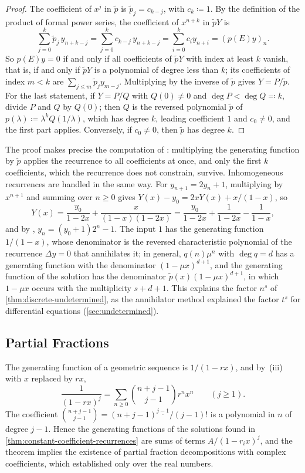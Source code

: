\begin{proof}
The coefficient of $x^j$ in $\tilde p$ is $\tilde p_j=c_{k-j}$, with $c_k\coloneqq1$. By the definition of the product of formal power series, the coefficient of $x^{n+k}$ in $\tilde pY$ is
\[
\sum_{j=0}^k\tilde p_j\,y_{n+k-j}=\sum_{j=0}^kc_{k-j}\,y_{n+k-j}=\sum_{i=0}^kc_iy_{n+i}=(p(E)y)_n .
\]
So $p(E)y=0$ if and only if all coefficients of $\tilde pY$ with index at least $k$ vanish, that is, if and only if $\tilde pY$ is a polynomial of degree less than $k$; its coefficients of index $m<k$ are $\sum_{j\le m}\tilde p_jy_{m-j}$. Multiplying by the inverse of $\tilde p$ gives $Y=P/\tilde p$. For the last statement, if $Y=P/Q$ with $Q(0)\ne0$ and $\deg P<\deg Q\eqqcolon k$, divide $P$ and $Q$ by $Q(0)$; then $Q$ is the reversed polynomial $\tilde p$ of $p(\lambda)\coloneqq\lambda^kQ(1/\lambda)$, which has degree $k$, leading coefficient $1$ and $c_0\ne0$, and the first part applies. Conversely, if $c_0\ne0$, then $\tilde p$ has degree $k$.
\end{proof}

The proof makes precise the computation of : multiplying the generating function by $\tilde p$ applies the recurrence to all coefficients at once, and only the first $k$ coefficients, which the recurrence does not constrain, survive. Inhomogeneous recurrences are handled in the same way. For $y_{n+1}=2y_n+1$, multiplying by $x^{n+1}$ and summing over $n\ge0$ gives $Y(x)-y_0=2xY(x)+x/(1-x)$, so
\[
Y(x)=\frac{y_0}{1-2x}+\frac x{(1-x)(1-2x)}=\frac{y_0}{1-2x}+\frac1{1-2x}-\frac1{1-x},
\]
and by , $y_n=(y_0+1)2^n-1$. The input $1$ has the generating function $1/(1-x)$, whose denominator is the reversed characteristic polynomial of the recurrence $\Delta y=0$ that annihilates it; in general, $q(n)\mu^n$ with $\deg q=d$ has a generating function with the denominator $(1-\mu x)^{d+1}$, and the generating function of the solution has the denominator $\tilde p(x)(1-\mu x)^{d+1}$, in which $1-\mu x$ occurs with the multiplicity $s+d+1$. This explains the factor $n^s$ of \cref{thm:discrete-undetermined}, as the annihilator method explained the factor $t^s$ for differential equations (\cref{sec:undetermined}).

\subsection{Partial Fractions}

The generating function of a geometric sequence is $1/(1-rx)$, and by \,(iii) with $x$ replaced by $rx$,
\begin{equation}
\frac1{(1-rx)^j}=\sum_{n\ge0}\binom{n+j-1}{j-1}r^nx^n\qquad(j\ge1).
\label{eq:gf-power-of-geometric}
\end{equation}
The coefficient $\binom{n+j-1}{j-1}=(n+j-1)^{\underline{j-1}}/(j-1)!$ is a polynomial in $n$ of degree $j-1$. Hence the generating functions of the solutions found in \cref{thm:constant-coefficient-recurrences} are sums of terms $A/(1-r_ix)^j$, and the theorem implies the existence of partial fraction decompositions with complex coefficients, which  established only over the real numbers.

